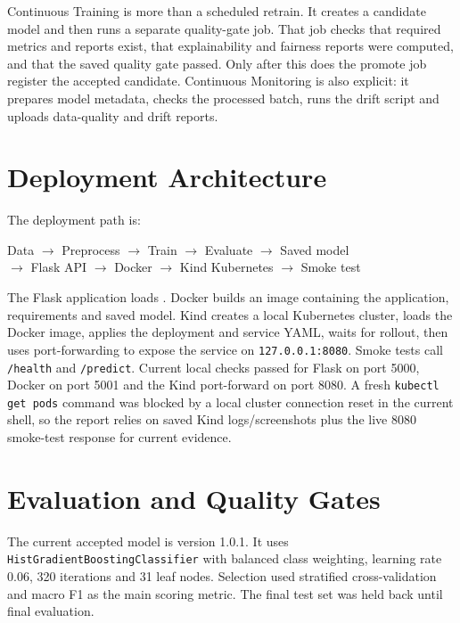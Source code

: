 \documentclass[journal,twoside,web]{ieeecolor}
\begin{document}
Continuous Training is more than a scheduled retrain. It creates a candidate model and then runs a separate quality-gate job. That job checks that required metrics and reports exist, that explainability and fairness reports were computed, and that the saved quality gate passed. Only after this does the promote job register the accepted candidate. Continuous Monitoring is also explicit: it prepares model metadata, checks the processed batch, runs the drift script and uploads data-quality and drift reports.

\section{Deployment Architecture}
The deployment path is:
\begin{center}
\scriptsize Data $\rightarrow$ Preprocess $\rightarrow$ Train $\rightarrow$ Evaluate $\rightarrow$ Saved model\\
$\rightarrow$ Flask API $\rightarrow$ Docker $\rightarrow$ Kind Kubernetes $\rightarrow$ Smoke test
\end{center}
The Flask application loads . Docker builds an image containing the application, requirements and saved model. Kind creates a local Kubernetes cluster, loads the Docker image, applies the deployment and service YAML, waits for rollout, then uses port-forwarding to expose the service on \texttt{127.0.0.1:8080}. Smoke tests call \texttt{/health} and \texttt{/predict}. Current local checks passed for Flask on port 5000, Docker on port 5001 and the Kind port-forward on port 8080. A fresh \texttt{kubectl get pods} command was blocked by a local cluster connection reset in the current shell, so the report relies on saved Kind logs/screenshots plus the live 8080 smoke-test response for current evidence.

\section{Evaluation and Quality Gates}
The current accepted model is version 1.0.1. It uses \texttt{HistGradientBoostingClassifier} with balanced class weighting, learning rate 0.06, 320 iterations and 31 leaf nodes. Selection used stratified cross-validation and macro F1 as the main scoring metric. The final test set was held back until final evaluation.
\end{document}
